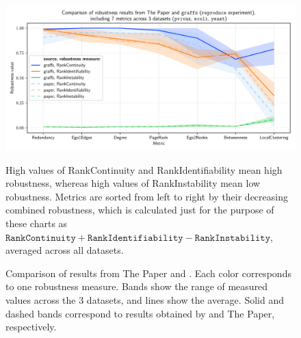 \begin{figure}
    \includegraphics[width=\linewidth]{plot_reproduction.pdf}
    \vspace*{-0.8cm}
    \caption{Comparison of results from The Paper and \graffs.
    Each color corresponds to one robustness measure.
    Bands show the range of measured values across the 3 datasets, and lines show the average.
    Solid and dashed bands correspond to results obtained by \graffs and The Paper, respectively.}
    \label{fig:plot_reproduction}
    \footnotesize\justify\vspace{-0.4\baselineskip}
    High values of RankContinuity and RankIdentifiability mean high robustness, whereas high values of RankInstability mean low robustness.
    Metrics are sorted from left to right by their decreasing combined robustness, which is calculated just for the purpose of these charts as $\texttt{RankContinuity} + \texttt{RankIdentifiability} - \texttt{RankInstability}$, averaged across all datasets.
    \vspace*{-2mm}
\end{figure}
